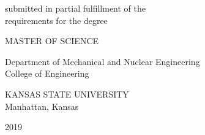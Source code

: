 \begin{center}
   \vspace{0.3cm}
   \begin{singlespace}
   submitted in partial fulfillment of the\\
   requirements for the degree\\
   \end{singlespace}

   \vspace{0.3cm}


   {\large MASTER OF SCIENCE}\\
   \vspace{0.3cm}


   \begin{singlespace}
   Department of Mechanical and Nuclear Engineering\\
   College of Engineering\\
   \end{singlespace}

   \vspace{0.3cm}

   \begin{singlespace}
   {\large KANSAS STATE UNIVERSITY}\\
   Manhattan, Kansas\\
   \end{singlespace}


   2019\\
   \vspace{0.3cm}

    \end{center}


